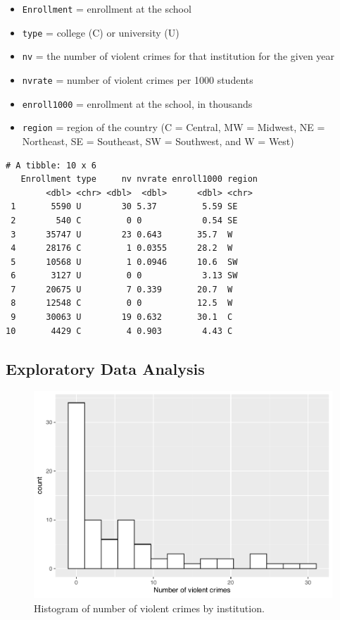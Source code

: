\documentclass[
]{krantz}
\providecommand{\tightlist}{%
  \setlength{\itemsep}{0pt}\setlength{\parskip}{0pt}}
\begin{document}
\begin{itemize}
\tightlist
\item
  \texttt{Enrollment} = enrollment at the school
\item
  \texttt{type} = college (C) or university (U)
\item
  \texttt{nv} = the number of violent crimes for that institution for the given year
\item
  \texttt{nvrate} = number of violent crimes per 1000 students
\item
  \texttt{enroll1000} = enrollment at the school, in thousands
\item
  \texttt{region} = region of the country (C = Central, MW = Midwest, NE = Northeast, SE = Southeast, SW = Southwest, and W = West)
\end{itemize}

\begin{verbatim}
# A tibble: 10 x 6
   Enrollment type     nv nvrate enroll1000 region
        <dbl> <chr> <dbl>  <dbl>      <dbl> <chr> 
 1       5590 U        30 5.37         5.59 SE    
 2        540 C         0 0            0.54 SE    
 3      35747 U        23 0.643       35.7  W     
 4      28176 C         1 0.0355      28.2  W     
 5      10568 U         1 0.0946      10.6  SW    
 6       3127 U         0 0            3.13 SW    
 7      20675 U         7 0.339       20.7  W     
 8      12548 C         0 0           12.5  W     
 9      30063 U        19 0.632       30.1  C     
10       4429 C         4 0.903        4.43 C     
\end{verbatim}

\subsection{Exploratory Data Analysis}\label{exploratory-data-analysis}

\begin{figure}

{\centering \includegraphics[width=0.6\linewidth]{bookdown-BeyondMLR_files/figure-latex/nviolent-1} 

}

\caption{Histogram of number of violent crimes by institution.}\label{fig:nviolent}
\end{figure}
\end{document}
